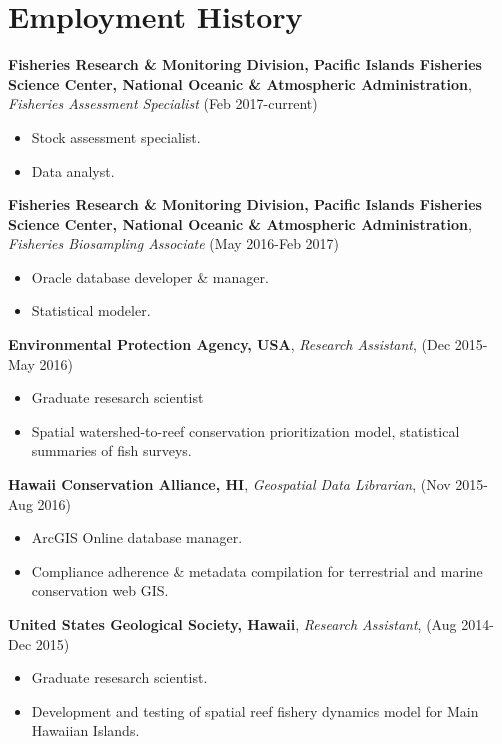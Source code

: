 \documentclass[10pt, letterpaper]{article}
\begin{document}
\section*{Employment History}
\textbf{Fisheries Research \& Monitoring Division, Pacific Islands Fisheries Science Center, National Oceanic \& Atmospheric Administration}, \textit{Fisheries Assessment Specialist} (Feb 2017-current)
\begin{itemize}
\vspace{-2.5mm}
  \item Stock assessment specialist.
  \item Data analyst.
\end{itemize}
\textbf{Fisheries Research \& Monitoring Division, Pacific Islands Fisheries Science Center, National Oceanic \& Atmospheric Administration}, \textit{Fisheries Biosampling Associate} (May 2016-Feb 2017)
\begin{itemize}
\vspace{-2.5mm}
\item Oracle database developer \& manager.
\item Statistical modeler.
\end{itemize}
\textbf{Environmental Protection Agency, USA}, \textit{Research Assistant}, (Dec 2015- May 2016)
\begin{itemize}
\vspace{-2.5mm}
\item Graduate resesarch scientist
\item Spatial watershed-to-reef conservation prioritization model, statistical summaries of fish surveys.
\end{itemize}
\textbf{Hawaii Conservation Alliance, HI}, \textit{Geospatial Data Librarian}, (Nov 2015- Aug 2016)
\begin{itemize}
\vspace{-2.5mm}
\item ArcGIS Online database manager.
\item Compliance adherence \& metadata compilation for terrestrial and marine conservation web GIS.
\end{itemize}
\textbf{United States Geological Society, Hawaii}, \textit{Research Assistant}, (Aug 2014- Dec 2015)
\begin{itemize}
\vspace{-2.5mm}
\item Graduate resesarch scientist.
\item Development and testing of spatial reef fishery dynamics model for Main Hawaiian Islands.
\end{itemize}
\end{document}
